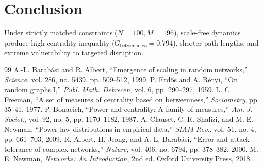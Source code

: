 \documentclass[11pt,a4paper]{article}
\begin{document}
\section{Conclusion}
Under strictly matched constraints ($N=100, M=196$), scale-free dynamics produce high centrality inequality ($G_{\text{betweenness}}=0.794$), shorter path lengths, and extreme vulnerability to targeted disruption.

\begin{thebibliography}{99}
 A.-L. Barab\'asi and R. Albert, ``Emergence of scaling in random networks,'' \emph{Science}, vol. 286, no. 5439, pp. 509--512, 1999.
 P. Erd\H{o}s and A. R\'enyi, ``On random graphs I,'' \emph{Publ. Math. Debrecen}, vol. 6, pp. 290--297, 1959.
 L. C. Freeman, ``A set of measures of centrality based on betweenness,'' \emph{Sociometry}, pp. 35--41, 1977.
 P. Bonacich, ``Power and centrality: A family of measures,'' \emph{Am. J. Sociol.}, vol. 92, no. 5, pp. 1170--1182, 1987.
 A. Clauset, C. R. Shalizi, and M. E. Newman, ``Power-law distributions in empirical data,'' \emph{SIAM Rev.}, vol. 51, no. 4, pp. 661--703, 2009.
 R. Albert, H. Jeong, and A.-L. Barab\'asi, ``Error and attack tolerance of complex networks,'' \emph{Nature}, vol. 406, no. 6794, pp. 378--382, 2000.
 M. E. Newman, \emph{Networks: An Introduction}, 2nd ed. Oxford University Press, 2018.
\end{thebibliography}
\end{document}
